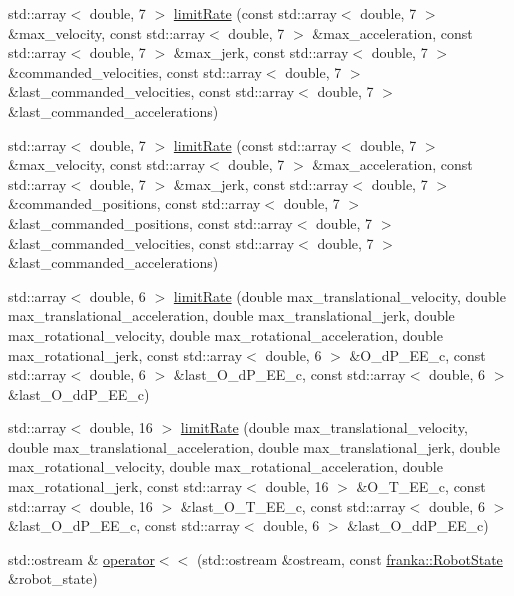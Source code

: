 \begin{DoxyCompactItemize}
std\+::array$<$ double, 7 $>$ \hyperlink{namespacefranka_aa778ddc24969b8eac4f26e86858dfb5a}{limit\+Rate} (const std\+::array$<$ double, 7 $>$ \&max\+\_\+velocity, const std\+::array$<$ double, 7 $>$ \&max\+\_\+acceleration, const std\+::array$<$ double, 7 $>$ \&max\+\_\+jerk, const std\+::array$<$ double, 7 $>$ \&commanded\+\_\+velocities, const std\+::array$<$ double, 7 $>$ \&last\+\_\+commanded\+\_\+velocities, const std\+::array$<$ double, 7 $>$ \&last\+\_\+commanded\+\_\+accelerations)
\item 
std\+::array$<$ double, 7 $>$ \hyperlink{namespacefranka_ac6ebb1c79c15c7d00a2fa621a968d622}{limit\+Rate} (const std\+::array$<$ double, 7 $>$ \&max\+\_\+velocity, const std\+::array$<$ double, 7 $>$ \&max\+\_\+acceleration, const std\+::array$<$ double, 7 $>$ \&max\+\_\+jerk, const std\+::array$<$ double, 7 $>$ \&commanded\+\_\+positions, const std\+::array$<$ double, 7 $>$ \&last\+\_\+commanded\+\_\+positions, const std\+::array$<$ double, 7 $>$ \&last\+\_\+commanded\+\_\+velocities, const std\+::array$<$ double, 7 $>$ \&last\+\_\+commanded\+\_\+accelerations)
\item 
std\+::array$<$ double, 6 $>$ \hyperlink{namespacefranka_a7f2f3179adc4b960bde0a44ab1cc4fcc}{limit\+Rate} (double max\+\_\+translational\+\_\+velocity, double max\+\_\+translational\+\_\+acceleration, double max\+\_\+translational\+\_\+jerk, double max\+\_\+rotational\+\_\+velocity, double max\+\_\+rotational\+\_\+acceleration, double max\+\_\+rotational\+\_\+jerk, const std\+::array$<$ double, 6 $>$ \&O\+\_\+d\+P\+\_\+\+E\+E\+\_\+c, const std\+::array$<$ double, 6 $>$ \&last\+\_\+\+O\+\_\+d\+P\+\_\+\+E\+E\+\_\+c, const std\+::array$<$ double, 6 $>$ \&last\+\_\+\+O\+\_\+dd\+P\+\_\+\+E\+E\+\_\+c)
\item 
std\+::array$<$ double, 16 $>$ \hyperlink{namespacefranka_a304bcb6a14ee8247a951f1c3cfd12711}{limit\+Rate} (double max\+\_\+translational\+\_\+velocity, double max\+\_\+translational\+\_\+acceleration, double max\+\_\+translational\+\_\+jerk, double max\+\_\+rotational\+\_\+velocity, double max\+\_\+rotational\+\_\+acceleration, double max\+\_\+rotational\+\_\+jerk, const std\+::array$<$ double, 16 $>$ \&O\+\_\+\+T\+\_\+\+E\+E\+\_\+c, const std\+::array$<$ double, 16 $>$ \&last\+\_\+\+O\+\_\+\+T\+\_\+\+E\+E\+\_\+c, const std\+::array$<$ double, 6 $>$ \&last\+\_\+\+O\+\_\+d\+P\+\_\+\+E\+E\+\_\+c, const std\+::array$<$ double, 6 $>$ \&last\+\_\+\+O\+\_\+dd\+P\+\_\+\+E\+E\+\_\+c)
\item 
std\+::ostream \& \hyperlink{namespacefranka_af7f0b8af2eb1f9a3cc2077a3c8fcf1d6}{operator$<$$<$} (std\+::ostream \&ostream, const \hyperlink{structfranka_1_1RobotState}{franka\+::\+Robot\+State} \&robot\+\_\+state)

\end{DoxyCompactItemize}
